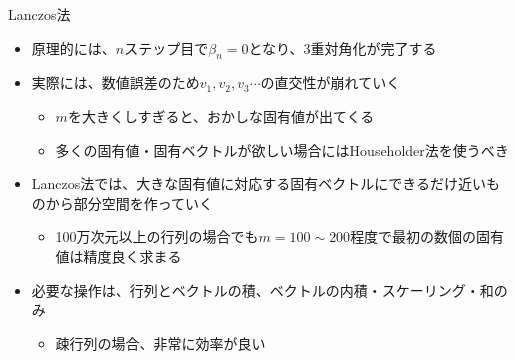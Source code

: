 \begin{frame}[t,fragile]{Lanczos法}
  \begin{itemize}
  \item 原理的には、$n$ステップ目で$\beta_n=0$となり、3重対角化が完了する
  \item 実際には、数値誤差のため$v_1,v_2,v_3\cdots$の直交性が崩れていく
    \begin{itemize}
      \item $m$を大きくしすぎると、おかしな固有値が出てくる
      \item 多くの固有値・固有ベクトルが欲しい場合にはHouseholder法を使うべき
    \end{itemize}
  \item Lanczos法では、大きな固有値に対応する固有ベクトルにできるだけ近いものから部分空間を作っていく
    \begin{itemize}
      \item 100万次元以上の行列の場合でも$m=100 \sim 200$程度で最初の数個の固有値は精度良く求まる
    \end{itemize}
  \item 必要な操作は、行列とベクトルの積、ベクトルの内積・スケーリング・和のみ
    \begin{itemize}
      \item 疎行列の場合、非常に効率が良い
    \end{itemize}
  \end{itemize}
\end{frame}
